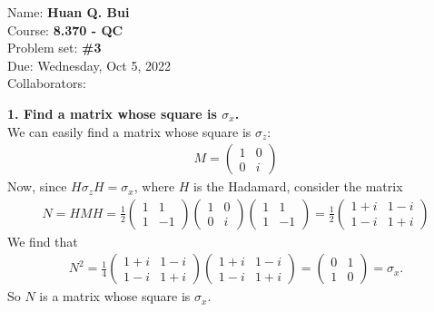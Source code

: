 \documentclass{article}
\theoremstyle{definition}
\newcommand{\f}[2]{\frac{#1}{#2}}
\begin{document}
\begin{framed}
\noindent Name: \textbf{Huan Q. Bui}\\
Course: \textbf{8.370 - QC}\\
Problem set: \textbf{\#3}\\
Due: Wednesday, Oct 5, 2022\\
Collaborators: 
\end{framed}

\noindent \textbf{1. Find a matrix whose square is $\sigma_x$.}\\

\noindent We can easily find a matrix whose square is $\sigma_z$:
\begin{align*}
	M = \begin{pmatrix}
		1 & 0 \\ 0 & i
	\end{pmatrix}
\end{align*}
Now, since $H \sigma_z H = \sigma_x$, where $H$ is the Hadamard, consider the matrix
\begin{align*}
	N = HMH = \f{1}{2}\begin{pmatrix}
		1 & 1 \\ 1 & -1
	\end{pmatrix}
	\begin{pmatrix}
		1 & 0 \\ 0 & i
	\end{pmatrix}
	\begin{pmatrix}
		1 & 1 \\ 1 & -1
	\end{pmatrix}
	= \f{1}{2}
	\begin{pmatrix}
		1 + i & 1 - i \\ 1 -i & 1 + i
	\end{pmatrix}
\end{align*}
We find that
\begin{align*}
	N^2 = \f{1}{4}
	\begin{pmatrix}
		1 + i & 1 - i \\ 1 -i & 1 + i
	\end{pmatrix} 
\begin{pmatrix}
1 + i & 1 - i \\ 1 -i & 1 + i
\end{pmatrix} = \begin{pmatrix}
0 & 1 \\ 1 & 0 
\end{pmatrix} = \sigma_x.
\end{align*}
So $N$ is a matrix whose square is $\sigma_x$.\\
\end{document}
